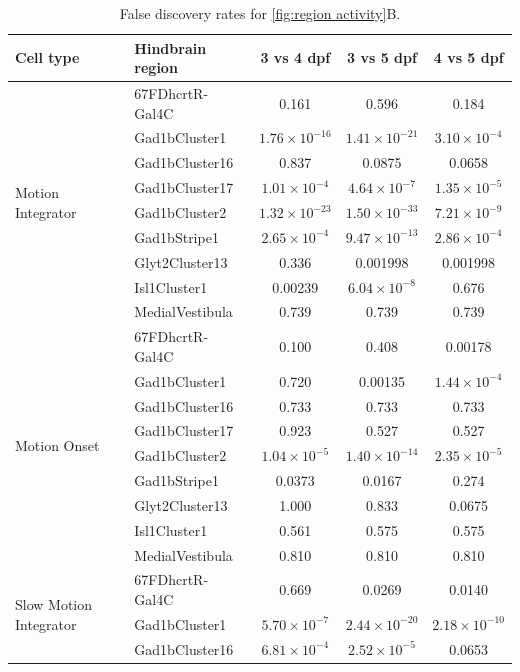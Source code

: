 \documentclass[12pt, a4paper, oneside]{article}
\begin{document}
\begin{table}[ht]
	\centering
	\footnotesize
	\caption{False discovery rates for \autoref{fig:region activity}B.}
	\begin{tabular}{llccc}
		\hline
		Cell type & Hindbrain region & 3 vs 4 dpf & 3 vs 5 dpf & 4 vs 5 dpf \\
		\hline
		\multirow{9}{*}{Motion Integrator}
		& 67FDhcrtR-Gal4C   & 0.161 & 0.596 & 0.184 \\
		& Gad1bCluster1     & $1.76\times10^{-16}$ & $1.41\times10^{-21}$ & $3.10\times10^{-4}$ \\
		& Gad1bCluster16    & 0.837 & 0.0875 & 0.0658 \\
		& Gad1bCluster17    & $1.01\times10^{-4}$ & $4.64\times10^{-7}$ & $1.35\times10^{-5}$ \\
		& Gad1bCluster2     & $1.32\times10^{-23}$ & $1.50\times10^{-33}$ & $7.21\times10^{-9}$ \\
		& Gad1bStripe1      & $2.65\times10^{-4}$ & $9.47\times10^{-13}$ & $2.86\times10^{-4}$ \\
		& Glyt2Cluster13    & 0.336 & 0.001998 & 0.001998 \\
		& Isl1Cluster1      & 0.00239 & $6.04\times10^{-8}$ & 0.676 \\
		& MedialVestibula   & 0.739 & 0.739 & 0.739 \\
		\hline
		\multirow{9}{*}{Motion Onset}
		& 67FDhcrtR-Gal4C   & 0.100 & 0.408 & 0.00178 \\
		& Gad1bCluster1     & 0.720 & 0.00135 & $1.44\times10^{-4}$ \\
		& Gad1bCluster16    & 0.733 & 0.733 & 0.733 \\
		& Gad1bCluster17    & 0.923 & 0.527 & 0.527 \\
		& Gad1bCluster2     & $1.04\times10^{-5}$ & $1.40\times10^{-14}$ & $2.35\times10^{-5}$ \\
		& Gad1bStripe1      & 0.0373 & 0.0167 & 0.274 \\
		& Glyt2Cluster13    & 1.000 & 0.833 & 0.0675 \\
		& Isl1Cluster1      & 0.561 & 0.575 & 0.575 \\
		& MedialVestibula   & 0.810 & 0.810 & 0.810 \\
		\hline
		\multirow{9}{*}{Slow Motion Integrator}
		& 67FDhcrtR-Gal4C   & 0.669 & 0.0269 & 0.0140 \\
		& Gad1bCluster1     & $5.70\times10^{-7}$ & $2.44\times10^{-20}$ & $2.18\times10^{-10}$ \\
		& Gad1bCluster16    & $6.81\times10^{-4}$ & $2.52\times10^{-5}$ & 0.0653 \\

\end{tabular}
\end{table}
\end{document}
